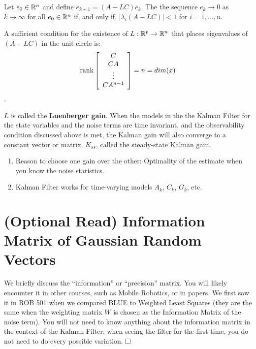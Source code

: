 {\begin{fact} Let $e_0 \in \mathbb R^n$ and define $e_{k+1} = (A-LC)e_k$. The the sequence $e_k \rightarrow 0$ as $k \rightarrow \infty $ for all $e_0 \in \mathbb R^n$ if, and only if, $|\lambda_i(A-LC) | < 1$ for $i = 1,\ldots,n$.
\end{fact}

\begin{fact} A sufficient condition for the existence of $L:\mathbb R^p \to \mathbb R^n$ that places eigenvalues of $(A-LC)$ in the unit circle is:
$$\mathrm{rank}\left[ \begin{array}{c} C \\ CA \\ \vdots \\ CA^{n-1} \end{array} \right] = n = dim(x)$$.
\end{fact}

\begin{rem} $L$ is called the \textbf{Luenberger gain}. When the models in the the Kalman Filter for the state variables and the noise terms are time invariant, and the observability condition discussed above is met, the Kalman gain will also converge to a constant vector or matrix, $K_{ss}$, called the steady-state Kalman gain.
\begin{enumerate}
\item Reason to choose one gain over the other: Optimality of the estimate when you know the noise statistics.
\item Kalman Filter works for time-varying models $A_k$, $C_k$, $G_k$, etc.
\end{enumerate}

\end{rem}




\section{(Optional Read) Information Matrix of Gaussian Random Vectors}

\begin{rem} We briefly discuss the ``information'' or ``precision'' matrix. You will likely encounter it in other courses, such as Mobile Robotics, or in papers. We first saw it in ROB 501 when we compared BLUE to Weighted Least Squares (they are the same when the weighting matrix $W$ is chosen as the Information Matrix of the noise term). You will not need to know anything about the information matrix in the context of the Kalman Filter: when seeing the filter for the first time, you do not need to do every possible variation. 
$\hfill \square$  \end{rem}

}
